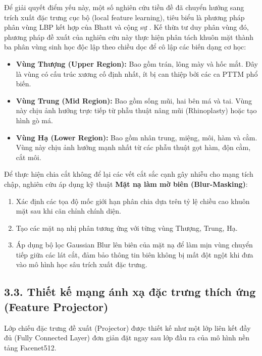 Để giải quyết điểm yếu này, một số nghiên cứu tiền đề đã chuyển hướng sang trích xuất đặc trưng cục bộ (local feature learning), tiêu biểu là phương pháp phân vùng LBP kết hợp của Bhatt và cộng sự \cite{iiitd_plastic_surgery}. Kế thừa tư duy phân vùng đó, phương pháp đề xuất của nghiên cứu này thực hiện phân tách khuôn mặt thành ba phân vùng sinh học độc lập theo chiều dọc để cô lập các biến dạng cơ học:
\begin{itemize}
    \item \textbf{Vùng Thượng (Upper Region):} Bao gồm trán, lông mày và hốc mắt. Đây là vùng có cấu trúc xương cố định nhất, ít bị can thiệp bởi các ca PTTM phổ biến.
    \item \textbf{Vùng Trung (Mid Region):} Bao gồm sống mũi, hai bên má và tai. Vùng này chịu ảnh hưởng trực tiếp từ phẫu thuật nâng mũi (Rhinoplasty) hoặc tạo hình gò má.
    \item \textbf{Vùng Hạ (Lower Region):} Bao gồm nhân trung, miệng, môi, hàm và cằm. Vùng này chịu ảnh hưởng mạnh nhất từ các phẫu thuật gọt hàm, độn cằm, cắt môi.
\end{itemize}

Để thực hiện chia cắt không để lại các vết cắt sắc cạnh gây nhiễu cho mạng tích chập, nghiên cứu áp dụng kỹ thuật \textbf{Mặt nạ làm mờ biên (Blur-Masking)}:
\begin{enumerate}
    \item Xác định các tọa độ mốc giới hạn phân chia dựa trên tỷ lệ chiều cao khuôn mặt sau khi căn chỉnh chính diện.
    \item Tạo các mặt nạ nhị phân tương ứng với từng vùng Thượng, Trung, Hạ.
    \item Áp dụng bộ lọc Gaussian Blur lên biên của mặt nạ để làm mịn vùng chuyển tiếp giữa các lát cắt, đảm bảo thông tin biên không bị mất đột ngột khi đưa vào mô hình học sâu trích xuất đặc trưng.
\end{enumerate}

\subsection*{3.3. Thiết kế mạng ánh xạ đặc trưng thích ứng (Feature Projector)}

Lớp chiếu đặc trưng đề xuất (Projector) được thiết kế như một lớp liên kết đầy đủ (Fully Connected Layer) đơn giản đặt ngay sau lớp đầu ra của mô hình nền tảng Facenet512.

